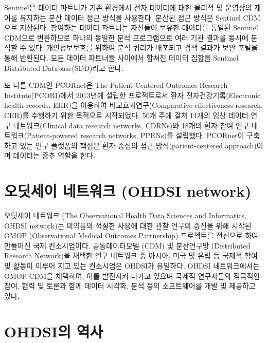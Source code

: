 \documentclass[]{book}
\begin{document}
Sentinel은 데이터 파트너가 기존 환경에서 전자 데이터에 대한 물리적 및 운영상의 제어를 유지하는 분산 데이터 접근 방식을 사용한다. 분산된 접근 방식은 Sentinel CDM으로 저장된다. 참여하는 데이터 파트너는 자신들이 보유한 데이터를 통일된 Sentinel CDM으로 변환하므로 하나의 동일한 분석 프로그램으로 여러 기관 결과를 동시에 분석할 수 있다. 개인정보보호를 위하여 분석 쿼리가 배포되고 검색 결과가 보안 포털을 통해 반환된다. 모든 데이터 파트너들 사이에서 합쳐진 데이터 집합을 Sentinel Distributed Database(SDD)라고 한다.

또 다른 CDM인 PCORnet은 The Patient-Centered Outcomes Research Institute(PCORI)에서 2013년에 설립한 프로젝트로서 환자 전자건강기록(Electronic health records, EHR)을 이용하여 비교효과연구(Comparative effectiveness research, CER)를 수행하기 위한 목적으로 시작되었다. 50개 주에 걸쳐 11개의 임상 데이터 연구 네트워크(Clinical data research networks, CDRNs)와 18개의 환자 참여 연구 네트워크(Patient-powered research networks, PPRNs)를 설립했다. PCORnet이 구축하고 있는 연구 플랫폼의 핵심은 환자 중심의 접근 방식(patient-centered approach)이며 데이터는 중추 역할을 한다.

\hypertarget{OHDSINetwork}{%
\section{오딧세이 네트워크 (OHDSI network)}\label{OHDSINetwork}}

오딧세이 네트워크 (The Observational Health Data Sciences and Informatics, OHDSI network)는 의약품의 적절한 사용에 대한 관찰 연구의 증진을 위해 시작된 OMOP (Observational Medical Outcomes Partnership) 프로젝트를 전신으로 하여 만들어진 국제 컨소시엄이다. 공통데이터모델 (CDM) 및 분산연구망 (Distributed Research Network)을 채택한 연구 네트워크 중 아시아, 미국 및 유럽 등 국제적 참여 및 활동이 이루어 지고 있는 컨소시엄은 OHDSI가 유일하다. OHDSI 네트워크에서는 OMOP-CDM을 채택하여, 이를 발전시켜 나가고 있으며 국제적 연구자들의 적극적인 참여, 협력 및 토론과 함께 데이터 시각화, 분석 등의 소프트웨어를 개발 및 제공하고 있다.

\hypertarget{OHDSIHistory}{%
\section{OHDSI의 역사}\label{OHDSIHistory}}
\end{document}
